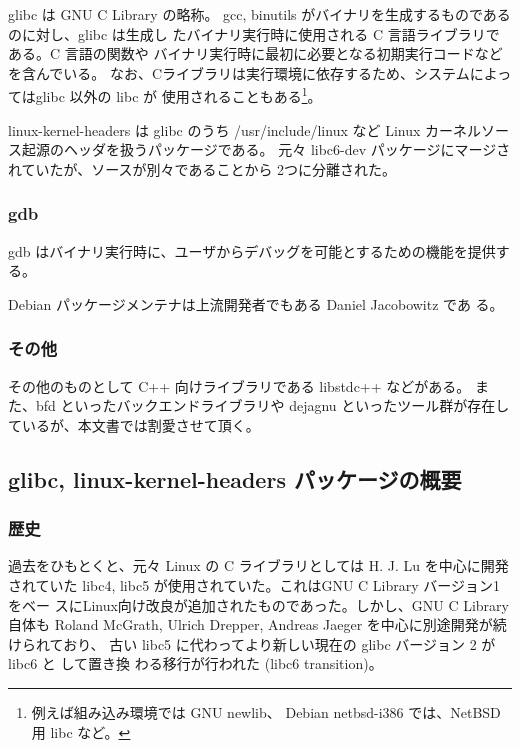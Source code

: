 \documentclass[mingoth]{jsarticle}
\begin{document}
    glibc は GNU C Library の略称。
    gcc, binutils がバイナリを生成するものであるのに対し、glibc は生成し
    たバイナリ実行時に使用される C 言語ライブラリである。C 言語の関数や
    バイナリ実行時に最初に必要となる初期実行コードなどを含んでいる。
    なお、Cライブラリは実行環境に依存するため、システムによってはglibc 以外の libc が
    使用されることもある\footnote{例えば組み込み環境では GNU newlib、
    Debian netbsd-i386 では、NetBSD 用 libc など。}。

    linux-kernel-headers は glibc のうち /usr/include/linux など
    Linux カーネルソース起源のヘッダを扱うパッケージである。
    元々 libc6-dev パッケージにマージされていたが、ソースが別々であることから
    2つに分離された。

  \subsubsection{gdb}

    gdb はバイナリ実行時に、ユーザからデバッグを可能とするための機能を提供する。

    Debian パッケージメンテナは上流開発者でもある Daniel Jacobowitz であ
    る。

  \subsubsection{その他}

    その他のものとして C++ 向けライブラリである libstdc++ などがある。
    また、bfd といったバックエンドライブラリや dejagnu といったツール群が存在し
    ているが、本文書では割愛させて頂く。

\subsection{glibc, linux-kernel-headers パッケージの概要}

  \subsubsection{歴史}

    過去をひもとくと、元々 Linux の C ライブラリとしては H. J. Lu を中心に開発されていた
    libc4, libc5 が使用されていた。これはGNU C Library バージョン1をベー
    スにLinux向け改良が追加されたものであった。しかし、GNU C Library 自体も Roland McGrath, Ulrich
    Drepper, Andreas Jaeger を中心に別途開発が続けられており、
    古い libc5 に代わってより新しい現在の glibc バージョン 2 が libc6 と
    して置き換
    わる移行が行われた (libc6 transition)。
\end{document}
